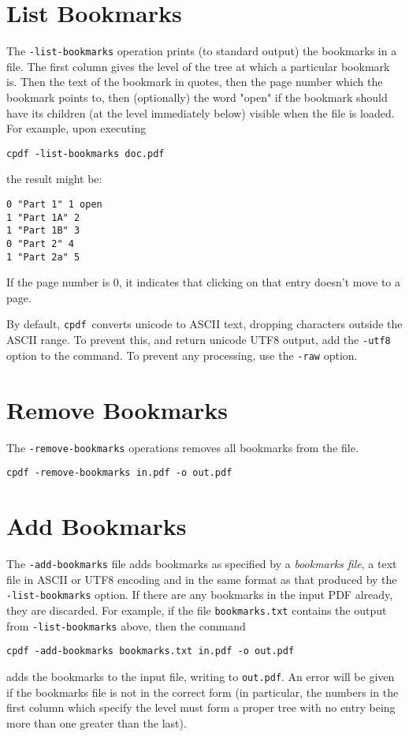 \documentclass{book}
\newcommand{\cpdf}{\texttt{cpdf}}
\begin{document}
  \section{List Bookmarks}
  The \texttt{-list-bookmarks} operation prints (to standard output) the
bookmarks in a file. The first column gives the level of the tree at which a
particular bookmark is. Then the text of the bookmark in quotes, then the page
number which the bookmark points to, then (optionally) the word "open" if the
bookmark should have its children (at the level immediately below) visible when
the file is loaded. For example, upon executing
\begin{framed}
  \small\verb!cpdf -list-bookmarks doc.pdf!
\end{framed}

\noindent the result might be:
\begin{framed}{\small\begin{verbatim}
0 "Part 1" 1 open
1 "Part 1A" 2
1 "Part 1B" 3
0 "Part 2" 4
1 "Part 2a" 5\end{verbatim}}\end{framed}
\noindent If the page number is 0, it indicates that clicking on that entry doesn't move to a page.

By default, \cpdf\ converts unicode to ASCII text, dropping characters outside
the ASCII range. To prevent this, and return unicode UTF8 output, add the
\texttt{-utf8} option to the command. To prevent any processing, use the
\texttt{-raw} option.

  \section{Remove Bookmarks}
  \label{removebookmarks}
  The \texttt{-remove-bookmarks} operations removes all bookmarks from the file.
  \begin{framed}
    \small\verb!cpdf -remove-bookmarks in.pdf -o out.pdf!
  \end{framed}

  \section{Add Bookmarks}
  
  The \texttt{-add-bookmarks} file adds bookmarks as specified by a
\textit{bookmarks file}, a text file in ASCII or UTF8 encoding and in the same format as that produced by the
\texttt{-list-bookmarks} option. If there are any bookmarks in the input PDF
already, they are discarded. For example, if the file \texttt{bookmarks.txt}
contains the output from \texttt{-list-bookmarks} above, then the command
  \begin{framed}
   \small\verb!cpdf -add-bookmarks bookmarks.txt in.pdf -o out.pdf!
  \end{framed}
\noindent adds the bookmarks to the input file, writing to \texttt{out.pdf}. An error
will be given if the bookmarks file is not in the correct form (in particular,
the numbers in the first column which specify the level must form a proper
tree with no entry being more than one greater than the last).
\end{document}
